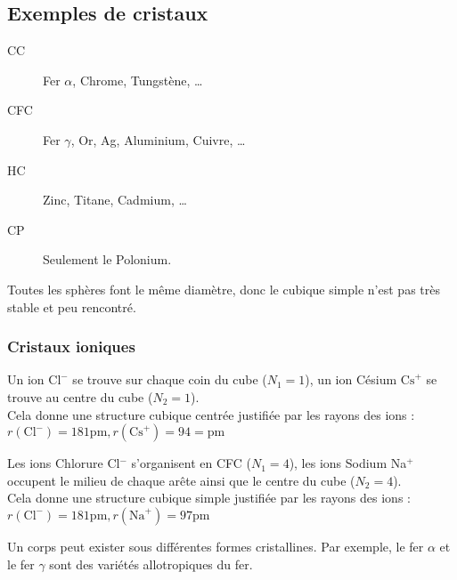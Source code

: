 \subsection*{Exemples de cristaux}
\begin{ex}
    \begin{description}
        \item[CC] Fer $\alpha$, Chrome, Tungstène, \dots
        \item[CFC] Fer $\gamma$, Or, Ag, Aluminium, Cuivre, \dots
        \item[HC] Zinc, Titane, Cadmium, \dots
        \item[CP] Seulement le Polonium.
    \end{description}
\end{ex}
\begin{rem}
    Toutes les sphères font le même diamètre, donc le cubique simple n'est pas
    très stable et peu rencontré.
\end{rem}

\subsubsection*{Cristaux ioniques}
\begin{ex}
    Un ion $\text{Cl}^-$ se trouve sur chaque coin du cube ($N_1 = 1$), un ion
    Césium $\text{Cs}^+$ se trouve au centre du cube ($N_2 = 1$).\\
    Cela donne une structure cubique centrée justifiée par les rayons des ions
    : $r(\text{Cl}^-) = 181\text{pm}, r(\text{Cs}^+) = 94 =\text{pm}$
\end{ex}
\begin{ex}
    Les ions Chlorure Cl$^-$ s'organisent en CFC ($N_1 = 4$), les ions Sodium
    Na$^+$ occupent le milieu de chaque arête ainsi que le centre du cube
    ($N_2 = 4$).\\
    Cela donne une structure cubique simple justifiée par les rayons des
    ions :
    $r(\text{Cl}^-) = 181\text{pm}, r(\text{Na}^+) = 97\text{pm}$
\end{ex}

\begin{rem}
    Un corps peut exister sous différentes formes cristallines. Par exemple,
    le fer $\alpha$ et le fer $\gamma$ sont des variétés allotropiques du
    fer.
\end{rem}

